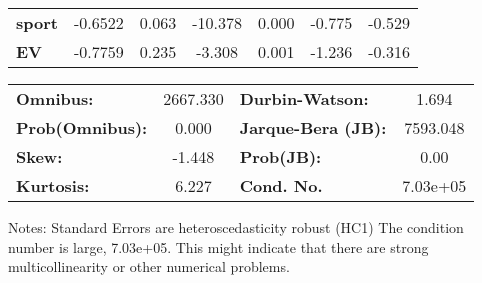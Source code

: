 \begin{center}
\begin{tabular}{lcccccc}
\textbf{sport}              &      -0.6522  &        0.063     &   -10.378  &         0.000        &       -0.775    &       -0.529     \\
\textbf{EV}                 &      -0.7759  &        0.235     &    -3.308  &         0.001        &       -1.236    &       -0.316     \\
\bottomrule
\end{tabular}
\begin{tabular}{lclc}
\textbf{Omnibus:}       & 2667.330 & \textbf{  Durbin-Watson:     } &    1.694  \\
\textbf{Prob(Omnibus):} &   0.000  & \textbf{  Jarque-Bera (JB):  } & 7593.048  \\
\textbf{Skew:}          &  -1.448  & \textbf{  Prob(JB):          } &     0.00  \\
\textbf{Kurtosis:}      &   6.227  & \textbf{  Cond. No.          } & 7.03e+05  \\
\bottomrule
\end{tabular}
\end{center}

Notes: \newline
 [1] Standard Errors are heteroscedasticity robust (HC1) \newline
 [2] The condition number is large, 7.03e+05. This might indicate that there are \newline
 strong multicollinearity or other numerical problems.